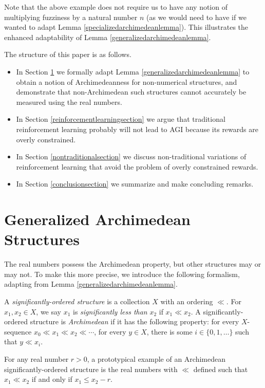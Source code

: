 \documentclass[twoside,11pt]{article}
\begin{document}
Note that the above example does not require us to have any notion
of multiplying fuzziness by a natural number $n$ (as we would need to have
if we wanted to adapt Lemma \ref{specializedarchimedeanlemma}).
This illustrates the enhanced adaptability of Lemma \ref{generalizedarchimedeanlemma}.

The structure of this paper is as follows.
\begin{itemize}
    \item
    In Section \ref{backgroundsection} we formally adapt
    Lemma \ref{generalizedarchimedeanlemma} to obtain a notion of Archimedeanness
    for non-numerical structures, and demonstrate that non-Archimedean such
    structures cannot accurately be measured using the real numbers.
    \item
    In Section \ref{reinforcementlearningsection} we argue that
    traditional reinforcement learning probably will not lead to AGI because
    its rewards are overly constrained.
    \item
    In Section \ref{nontraditionalsection} we discuss non-traditional
    variations of reinforcement learning that avoid the problem of
    overly constrained rewards.
    \item
    In Section \ref{conclusionsection} we summarize and make concluding remarks.
\end{itemize}


\section{Generalized Archimedean Structures}
\label{backgroundsection}

The real numbers possess the Archimedean property, but other structures
may or may not. To make this more precise,
we introduce the following formalism, adapting from Lemma \ref{generalizedarchimedeanlemma}.

\begin{definition}
\label{archimedeandefn}
    A \emph{significantly-ordered structure} is a collection $X$ with
    an ordering $\ll$.
    For $x_1,x_2\in X$, we say $x_1$ is \emph{significantly less than}
    $x_2$ if $x_1\ll x_2$.
    A significantly-ordered structure is \emph{Archimedean} if it
    has the following property: for every $X$-sequence
    $x_0\ll x_1\ll x_2 \ll \cdots$,
    for every $y\in X$, there is some $i\in\{0,1,\ldots\}$ such that $y\ll x_i$.
\end{definition}

For any real number $r>0$, a prototypical example of an Archimedean
significantly-ordered structure is the real
numbers with $\ll$ defined such that
$x_1\ll x_2$ if and only if $x_1\leq x_2-r$.
\end{document}
